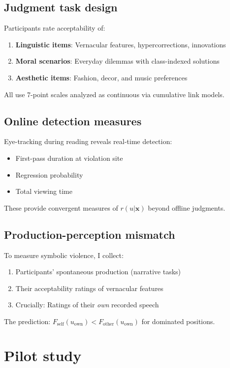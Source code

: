 \documentclass[12pt]{article}
\begin{document}
\subsection{Judgment task design}

Participants rate acceptability of:
\begin{enumerate}
\item \textbf{Linguistic items}: Vernacular features, hypercorrections, innovations
\item \textbf{Moral scenarios}: Everyday dilemmas with class-indexed solutions  
\item \textbf{Aesthetic items}: Fashion, decor, and music preferences
\end{enumerate}
All use 7-point scales analyzed as continuous via cumulative link models.

\subsection{Online detection measures}

Eye-tracking during reading reveals real-time detection:
\begin{itemize}
\item First-pass duration at violation site
\item Regression probability  
\item Total viewing time
\end{itemize}
These provide convergent measures of $r(u|\mathbf{x})$ beyond offline judgments.

\subsection{Production-perception mismatch}

To measure symbolic violence, I collect:
\begin{enumerate}
\item Participants' spontaneous production (narrative tasks)
\item Their acceptability ratings of vernacular features
\item Crucially: Ratings of their \emph{own} recorded speech
\end{enumerate}
The prediction: $F_{\text{self}}(u_{\text{own}}) < F_{\text{other}}(u_{\text{own}})$ for dominated positions.

\section{Pilot study}
\end{document}
